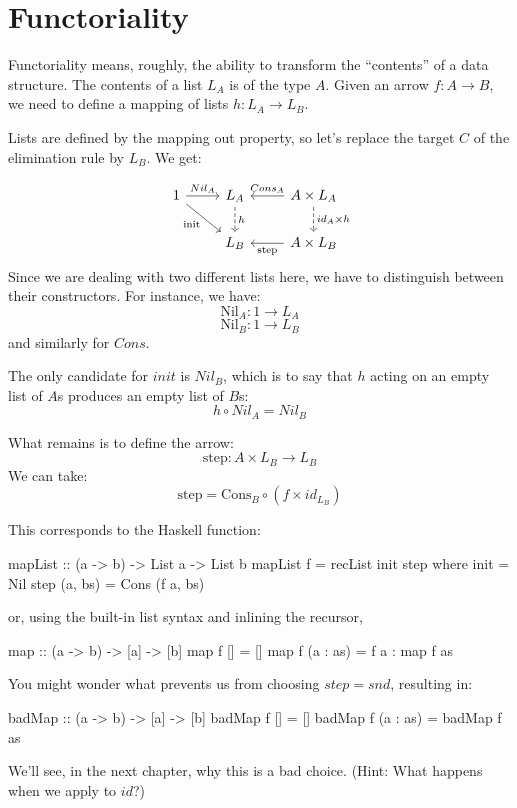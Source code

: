 \documentclass[DaoFP]{subfiles}
\begin{document}
\section{Functoriality}

Functoriality means, roughly, the ability to transform the ``contents'' of a data structure. The contents of a list $L_A$ is of the type $A$. Given an arrow $f \colon A \to B$, we need to define a mapping of lists $h \colon L_A \to L_B$.

Lists are defined by the mapping out property, so let's replace the target $C$ of the elimination rule by $L_B$. We get:

\[
 \begin{tikzcd}
 1
 \arrow[r, "Nil_A"]
 \arrow[rd, "\text{init}"']
 &L_A
\arrow[d, dashed, "h"]
&A \times L_A
  \arrow[l, "Cons_A"']
\arrow[d, dashed, "id_A \times h"]
\\
& L_B
& A \times L_B
\arrow[l, "\text{step}"]
  \end{tikzcd}
\]
Since we are dealing with two different lists here, we have to distinguish between their constructors. For instance, we have: 
\[\text{Nil}_A \colon 1 \to L_A \]
\[\text{Nil}_B \colon 1 \to L_B \]
and similarly for $Cons$.

The only candidate for $init$ is $Nil_B$, which is to say that $h$ acting on an empty list of $A$s produces an empty list of $B$s:
\[ h \circ Nil_A = Nil_B \]

What remains is to define the arrow:
\[\text{step} \colon A \times L_B \to L_B\]
We can take:
\[ \text{step} = \text{Cons}_B \circ (f \times id_{L_B}) \]

This corresponds to the Haskell function:

\begin{haskell}
mapList :: (a -> b) -> List a -> List b
mapList f = recList init step
  where
    init = Nil
    step (a, bs) = Cons (f a, bs)
\end{haskell}
or, using the built-in list syntax and inlining the recursor,
\begin{haskell}
map :: (a -> b) -> [a] -> [b]
map f [] = []
map f (a : as) = f a : map f as
\end{haskell}

You might wonder what prevents us from choosing $step = snd$, resulting in:
\begin{haskell}
badMap :: (a -> b) -> [a] -> [b]
badMap f [] = []
badMap f (a : as) = badMap f as
\end{haskell}
We'll see, in the next chapter, why this is a bad choice. (Hint: What happens when we apply  to $id$?)
\end{document}

